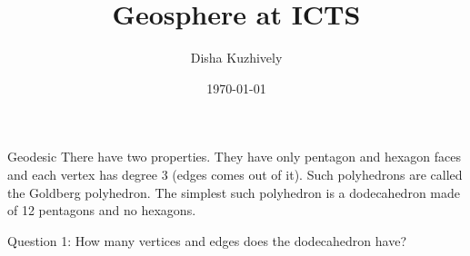\documentclass[a4paper,13pt]{article}
\title{Geosphere at ICTS}
\author{Disha Kuzhively}
\date{\today}
\begin{document}
Geodesic 
There have two properties.
They have only pentagon and hexagon faces and each vertex has degree 3   (edges comes out of it). Such polyhedrons are called the Goldberg polyhedron. The simplest such polyhedron is a dodecahedron made of 12 pentagons and no hexagons. 


Question 1: How many vertices and edges does the dodecahedron have? 
\end{document}
